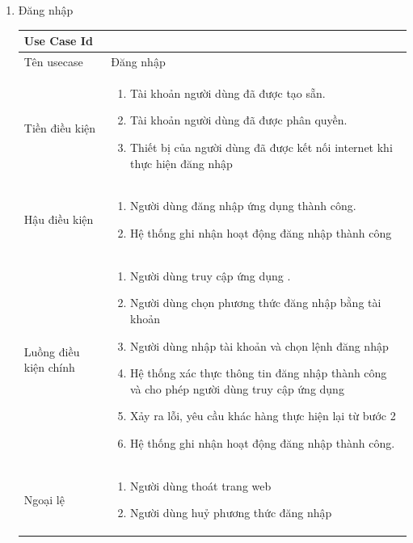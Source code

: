 \newpage
\begin{enumerate}
    \item Đăng nhập
\begin{center}{\color{black}}

    \begin{tabular}{|p{5cm}|p{7cm}|} \hline
    
        \textbf{Use Case Id} & \textbf{}  \\ \hline
        Tên usecase &  Đăng nhập\\ \hline
        Tiền điều kiện & 
            \begin{enumerate}[1.]                
                \item Tài khoản người dùng đã được tạo sẵn.
                \item Tài khoản người dùng đã được phân quyền.
                \item Thiết bị của người dùng đã được kết nối internet khi thực hiện đăng nhập
            \end{enumerate}\\ \hline
        
        Hậu điều kiện &
            \begin{enumerate}[1.]                
                \item Người dùng đăng nhập ứng dụng thành công.
                \item Hệ thống ghi nhận hoạt động đăng nhập thành công
            \end{enumerate}\\ \hline
        
        Luồng điều kiện chính &  
            \begin{enumerate}[1.]
                \item Người dùng truy cập ứng dụng .
                \item Người dùng chọn phương thức đăng nhập bằng tài khoản 
                \item  Người dùng nhập tài khoản  và chọn lệnh đăng nhập
                \item Hệ thống xác thực thông tin đăng nhập thành công và cho phép người dùng truy cập ứng dụng
                \item Xảy ra lỗi, yêu cầu khác hàng thực hiện lại từ bước 2
                \item Hệ thống ghi nhận hoạt động đăng nhập thành công.
            \end{enumerate}\\
        \hline
        Ngoại lệ &
            \begin{enumerate}[1.]                
                \item Người dùng thoát trang web
                \item Người dùng huỷ phương thức đăng nhập
            \end{enumerate}\\ \hline
        

\end{tabular}
\end{center}
\end{enumerate}
